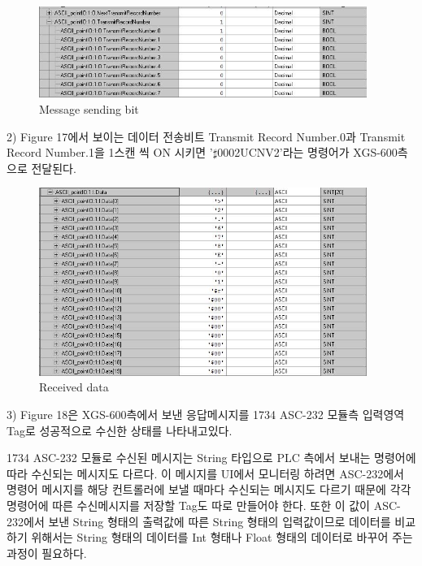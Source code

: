 \documentclass[11pt
  , a4paper
  , article
  , oneside
]{memoir}
\begin{document}
\begin{figure}[h]
	\centering
	\includegraphics[width=0.95\textwidth]{./picture/transmitbit.JPG}
	\caption{Message sending bit}
	\label{fig:}
\end{figure}

\newpage 

2) Figure 17에서 보이는 데이터 전송비트 Transmit Record Number.0과 Transmit Record Number.1을 1스캔 씩 ON 시키면 '$\sharp$0002UCNV2'라는 명령어가 XGS-600측으로 전달된다.\\

\begin{figure}[h]
 	\centering
 	\includegraphics[width=0.95\textwidth]{./picture/receiving.JPG}
 	\caption{Received data}
 	\label{fig:}
\end{figure}
 
3) Figure 18은 XGS-600측에서 보낸 응답메시지를 1734 ASC-232 모듈측 입력영역 Tag로 성공적으로 수신한 상태를 나타내고있다. \\
 
 \newpage
 
1734 ASC-232 모듈로 수신된 메시지는 String 타입으로 PLC 측에서 보내는 명령어에 따라 수신되는 메시지도 다르다. 이 메시지를 UI에서 모니터링 하려면 ASC-232에서 명령어 메시지를 해당 컨트롤러에 보낼 때마다 수신되는 메시지도 다르기 때문에 각각 명령어에 따른 수신메시지를 저장할 Tag도 따로 만들어야 한다. 또한 이 값이 ASC-232에서 보낸 String 형태의 출력값에 따른 String 형태의 입력값이므로 데이터를 비교하기 위해서는 String 형태의 데이터를 Int 형태나 Float 형태의 데이터로 바꾸어 주는 과정이 필요하다. \
\end{document}
